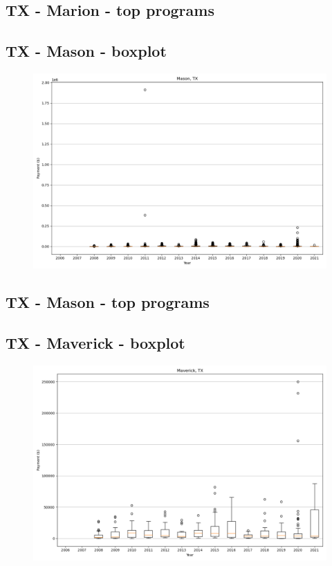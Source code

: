 \subsection*{TX - Marion - top programs}

\newpage
\subsection*{TX - Mason - boxplot}
\begin{figure}[h]
\centering
\includegraphics[width=7in]{../output/boxplots/counties/Mason-TX_boxplot.png}
\end{figure}


\subsection*{TX - Mason - top programs}

\newpage
\subsection*{TX - Maverick - boxplot}
\begin{figure}[h]
\centering
\includegraphics[width=7in]{../output/boxplots/counties/Maverick-TX_boxplot.png}
\end{figure}


